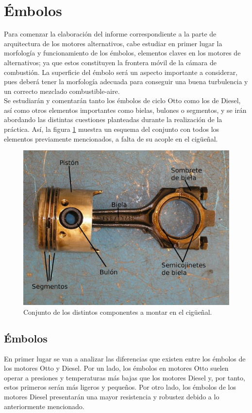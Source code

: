 \section{Émbolos} \label{s:section_01}

Para comenzar la elaboración del informe correspondiente a la parte de arquitectura de los motores alternativos, cabe estudiar en primer lugar la morfología y funcionamiento de los émbolos, elementos claves en los motores de alternativos; ya que estos constituyen la frontera móvil de la cámara de combustión. La superficie del émbolo será un aspecto importante a considerar, pues deberá tener la morfología adecuada para conseguir una buena turbulencia y un correcto mezclado combustible-aire.\\

Se estudiarán y comentarán tanto los émbolos de ciclo Otto como los de Diesel, así como otros elementos importantes como bielas, bulones o segmentos, y se irán abordando las distintas cuestiones planteadas durante la realización de la práctica. Así, la figura \ref{fig:emb_comp} muestra un esquema del conjunto con todos los elementos previamente mencionados, a falta de su acople en el cigüeñal.

\begin{figure}[H]
	\centering
	\includegraphics[width=0.6\linewidth]{Figures/01/m1/componentes.jpg}
	\caption{Conjunto de los distintos componentes a montar en el cigüeñal.}
	\label{fig:emb_comp}
\end{figure}

\subsection{Émbolos} \label{ss:piston}

En primer lugar se van a analizar las diferencias que existen entre los émbolos de los motores Otto y Diesel. Por un lado, los émbolos en motores Otto suelen operar a presiones y temperaturas más bajas que los motores Diesel y, por tanto, estos primeros serán más ligeros y pequeños. Por otro lado, los émbolos de los motores Diesel presentarán una mayor resistencia y robustez debido a lo anteriormente mencionado.\\

